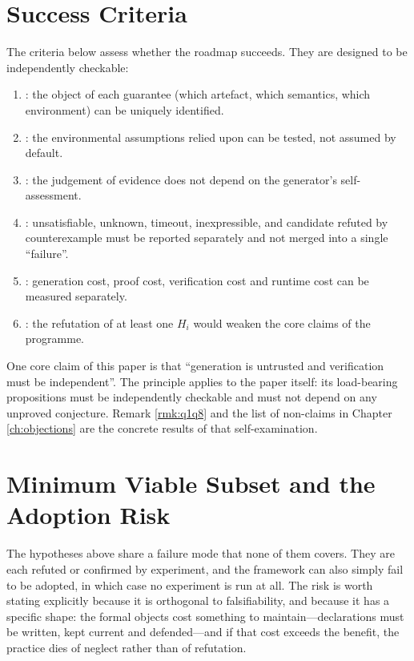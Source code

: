 \section{Success Criteria}

The criteria below assess whether the roadmap succeeds. They are designed to be
independently checkable:

\begin{enumerate}[label=(S\arabic*)]
\item {}: the object of each guarantee (which artefact, which
      semantics, which environment) can be uniquely identified.
\item {}: the environmental assumptions relied upon can be tested, not
      assumed by default.
\item {}: the judgement of evidence does not depend on the
      generator's self-assessment.
\item {}: unsatisfiable, unknown, timeout,
      inexpressible, and candidate refuted by counterexample must be reported separately and
      not merged into a single ``failure''.
\item {}: generation cost, proof cost, verification cost and runtime
      cost can be measured separately.
\item {}: the refutation of at least one $H_i$ would weaken the core
      claims of the programme.
\end{enumerate}

\begin{remark}
One core claim of this paper is that ``generation is untrusted and verification must be
independent''. The principle applies to the paper itself: its load-bearing propositions
must be independently checkable and must not depend on any unproved conjecture. Remark
\ref{rmk:q1q8} and the list of non-claims in Chapter \ref{ch:objections} are the concrete
results of that self-examination.
\end{remark}

\section{Minimum Viable Subset and the Adoption Risk}\label{sec:mvs}

The hypotheses above share a failure mode that none of them covers. They are each refuted or
confirmed by experiment, and the framework can also simply fail to be adopted, in which case no
experiment is run at all. The risk is worth stating explicitly because it is orthogonal to
falsifiability, and because it has a specific shape: the formal objects cost something to
maintain---declarations must be written, kept current and defended---and if that cost exceeds the
benefit, the practice dies of neglect rather than of refutation.

